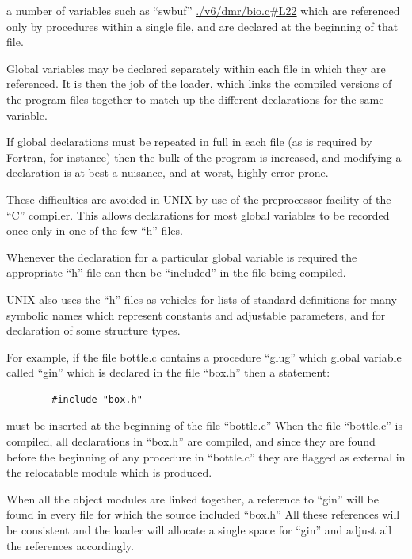 \item[(b)] a number of variables such as
``swbuf'' \url{./v6/dmr/bio.c#L22} which are referenced 
only by procedures within
a single file, and are declared
at the beginning of that file.
\ed

Global variables may be declared
separately within each file in which
they are referenced. It is then the job
of the loader, which links the compiled
versions of the program files together
to match up the different declarations
for the same variable.



If global declarations must be repeated
in full in each file (as is required by
Fortran, for instance) then the bulk of
the program is increased, and modifying
a declaration is at best a nuisance,
and at worst, highly error-prone.

These difficulties are avoided in UNIX
by use of the preprocessor facility of
the ``C'' compiler. This allows declarations 
for most global variables to be
recorded once only in one of the few
``h'' files.


Whenever the declaration for a particular 
global variable is required the
appropriate ``h'' file can then be
``included'' in the file being compiled.

UNIX also uses the ``h'' files as vehicles 
for lists of standard definitions
for many symbolic names which represent
constants and adjustable parameters,
and for declaration of some structure
types.

For example, if the file bottle.c
contains a procedure ``glug'' which
global variable called
``gin'' which is declared in the file
``box.h'' then a statement:

\begin{verbatim}
        #include "box.h"
\end{verbatim}

\noindent must be inserted at the beginning of
the file ``bottle.c'' When the file
``bottle.c'' is compiled, all declarations 
in ``box.h'' are compiled, and
since they are found before the beginning 
of any procedure in ``bottle.c''
they are flagged as external in the
relocatable module which is produced.

When all the object modules are linked
together, a reference to ``gin'' will be
found in every file for which the
source included ``box.h'' All these
references will be consistent and the
loader will allocate a single space for
``gin'' and adjust all the references
accordingly.


